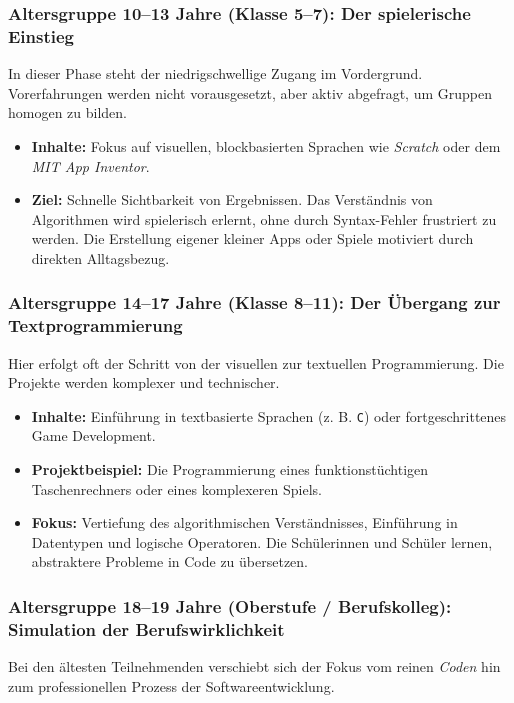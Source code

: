 \documentclass[a5paper,pagesize,10pt,bibtotoc,pointlessnumbers,
normalheadings,DIV=9,twoside=false]{scrbook}
\begin{document}
\subsubsection{Altersgruppe 10–13 Jahre (Klasse 5–7): Der spielerische Einstieg}

In dieser Phase steht der niedrigschwellige Zugang im Vordergrund. Vorerfahrungen werden nicht vorausgesetzt, aber aktiv abgefragt, um Gruppen homogen zu bilden.

\begin{itemize}
    \item \textbf{Inhalte:} Fokus auf visuellen, blockbasierten Sprachen wie \textit{Scratch} oder dem \textit{MIT App Inventor}.
    \item \textbf{Ziel:} Schnelle Sichtbarkeit von Ergebnissen. Das Verständnis von Algorithmen wird spielerisch erlernt, ohne durch Syntax-Fehler frustriert zu werden. Die Erstellung eigener kleiner Apps oder Spiele motiviert durch direkten Alltagsbezug.
\end{itemize}

\subsubsection{Altersgruppe 14–17 Jahre (Klasse 8–11): Der Übergang zur Textprogrammierung}

Hier erfolgt oft der Schritt von der visuellen zur textuellen Programmierung. Die Projekte werden komplexer und technischer.

\begin{itemize}
    \item \textbf{Inhalte:} Einführung in textbasierte Sprachen (z. B. \texttt{C}) oder fortgeschrittenes Game Development.
    \item \textbf{Projektbeispiel:} Die Programmierung eines funktionstüchtigen Taschenrechners oder eines komplexeren Spiels.
    \item \textbf{Fokus:} Vertiefung des algorithmischen Verständnisses, Einführung in Datentypen und logische Operatoren. Die Schülerinnen und Schüler lernen, abstraktere Probleme in Code zu übersetzen.
\end{itemize}

\subsubsection{Altersgruppe 18–19 Jahre (Oberstufe / Berufskolleg): Simulation der Berufswirklichkeit}

Bei den ältesten Teilnehmenden verschiebt sich der Fokus vom reinen \textit{Coden} hin zum professionellen Prozess der Softwareentwicklung.
\end{document}
